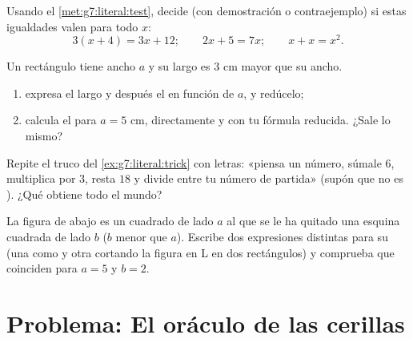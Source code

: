 \begin{exercise}[$\star\star$]\label{exo:g7:literal:8}
Usando el \cref{met:g7:literal:test}, decide (con demostración o
contraejemplo) si estas igualdades valen para todo $x$:
\[
3(x + 4) = 3x + 12; \qquad
2x + 5 = 7x; \qquad
x + x = x^2 .
\]
\end{exercise}

\begin{exercise}[$\star\star$]\label{exo:g7:literal:9}
Un rectángulo tiene ancho $a$ y su largo es $3$ cm mayor que su
ancho.
\begin{enumerate}
  \item expresa el largo y después el  en función de $a$, y
        redúcelo;
  \item calcula el  para $a = 5$ cm, directamente y con tu
        fórmula reducida. ¿Sale lo mismo?
\end{enumerate}
\end{exercise}

\begin{exercise}[$\star\star$]\label{exo:g7:literal:10}
Repite el truco del \cref{ex:g7:literal:trick} con letras: «piensa
un número, súmale $6$, multiplica por $3$, resta $18$ y divide entre tu
número de partida» (supón que no es ). ¿Qué obtiene todo el mundo?
\end{exercise}

\begin{exercise}[$\star\star\star$]\label{exo:g7:literal:11}
La figura de abajo es un cuadrado de lado $a$ al que se le ha quitado una esquina cuadrada
de lado $b$ ($b$ menor que $a$). Escribe dos expresiones distintas
para su  (una como  y otra cortando la figura en L en dos
rectángulos) y comprueba que coinciden para $a = 5$ y $b = 2$.
\end{exercise}

\section{Problema: El oráculo de las cerillas}

